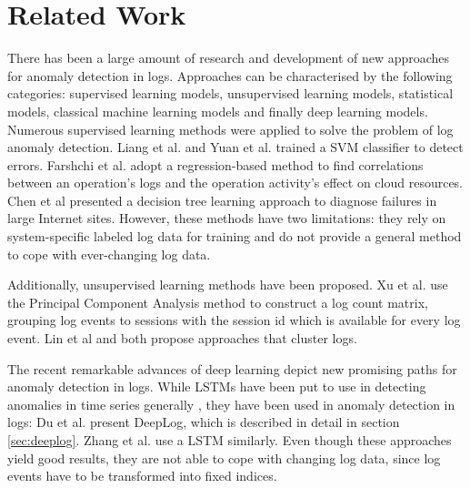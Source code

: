 \chapter{Related Work\label{cha:related_work}}


There has been a large amount of research and development of new approaches for anomaly detection in logs. %
Approaches can be characterised by the following categories: supervised learning models, unsupervised learning models, statistical models, classical machine learning models and finally deep learning models.
Numerous supervised learning methods were applied to solve the problem of log anomaly detection. Liang et al. \cite{liang2007failure} and Yuan et al. \cite{yuan2006automated} trained a SVM classifier to detect errors. Farshchi et al. \cite{farshchi2015anomaly} adopt a regression-based method to find correlations between an operation's logs and the operation activity's effect on cloud resources. Chen et al \cite{chen2004failure} presented a decision tree learning approach to diagnose failures in large Internet sites. However, these methods have two limitations: they rely on system-specific labeled log data for training and do not provide a general method to cope with ever-changing log data.

Additionally, unsupervised learning methods have been proposed. Xu et al. \cite{xu2009detecting} use the Principal Component Analysis method to construct a log count matrix, grouping log events to sessions with the session id which is available for every log event. Lin et al \cite{lin2016log} and \cite{vaarandi2003data} both propose approaches that cluster logs.

The recent remarkable advances of deep learning depict new promising paths for anomaly detection in logs. While LSTMs have been put to use in detecting anomalies in time series generally \cite{malhotra2015long}, they have been used in anomaly detection in logs: Du et al. \cite{du2017deeplog} present DeepLog, which is described in detail in section \ref{sec:deeplog}. Zhang et al. \cite{zhang2016automated} use a LSTM similarly. Even though these approaches yield good results, they are not able to cope with changing log data, since log events have to be transformed into fixed indices.

